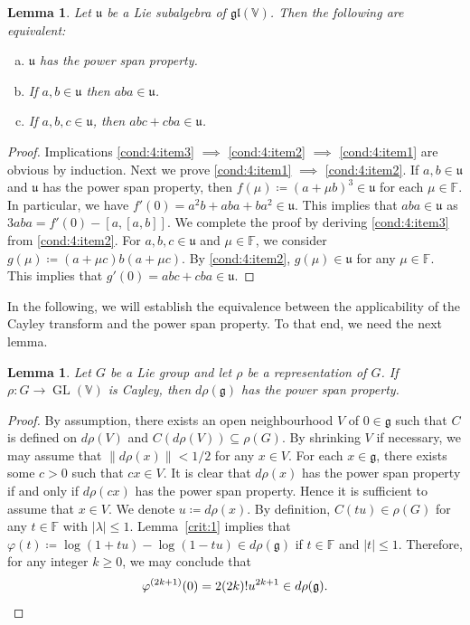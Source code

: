 \documentclass[11pt,reqno]{amsart}
\DeclareMathOperator{\GL}{GL}
\newtheorem{lemma}[theorem]{Lemma}
\begin{document}
\begin{lemma}\label{cond:4}
Let $\mathfrak{u}$ be a Lie subalgebra of $\mathfrak{gl}(\mathbb{V})$.  Then the following are equivalent:
\begin{enumerate}[(a)]
\item $\mathfrak{u}$ has the power span property. \label{cond:4:item1}
\item If $a, b \in \mathfrak{u}$ then $aba\in \mathfrak{u}$.  \label{cond:4:item2}
\item If $a, b, c \in \mathfrak{u}$,  then $abc + cba\in \mathfrak{u}$.  \label{cond:4:item3}
\end{enumerate}
\end{lemma}
\begin{proof}
Implications \eqref{cond:4:item3} $\implies$ \eqref{cond:4:item2} $\implies$ \eqref{cond:4:item1} are obvious by induction.  Next we prove \eqref{cond:4:item1} $\implies$ \eqref{cond:4:item2}.  If $a,b \in \mathfrak{u}$ and $\mathfrak{u}$ has the power span property,  then $f(\mu) \coloneqq (a+\mu b)^3 \in \mathfrak{u}$ for each $\mu \in \mathbb{F}$.  In particular,  we have $f'(0) = a^2b +aba +ba^2 \in \mathfrak{u}$.  This implies that $aba \in \mathfrak{u}$ as $3aba = f'(0) - [a,[a,b]]$.  We complete the proof by deriving \eqref{cond:4:item3} from \eqref{cond:4:item2}.  For $a,b,c\in \mathfrak{u}$ and $\mu \in \mathbb{F}$,  we consider $g(\mu) \coloneqq (a+\mu c)b(a+\mu c)$.  By \eqref{cond:4:item2},  $g(\mu) \in \mathfrak{u}$ for any $\mu \in \mathbb{F}$.  This implies that $g'(0) = abc + cba \in \mathfrak{u}$. 
\end{proof}

In the following,  we will establish the equivalence between the applicability of the Cayley transform and the power span property.  To that end,  we need the next lemma.
\begin{lemma}\label{lem:Cpsp}
Let $G$ be a Lie group and let $\rho$ be a representation of $G$.  If $\rho: G \to \GL(\mathbb{V})$ is Cayley,  then $d\rho (\mathfrak{g})$ has the power span property.
\end{lemma}
\begin{proof}
By assumption,  there exists an open neighbourhood $V$ of $0\in \mathfrak{g}$ such that $C$ is defined on $d\rho (V)$ and $C(d\rho(V)) \subseteq \rho(G)$.  By shrinking $V$ if necessary,  we may assume that $\lVert d\rho (x) \rVert < 1/2$ for any $x \in V$.  For each $x\in \mathfrak{g}$,  there exists some $c > 0$ such that $c x \in V$.  It is clear that $d\rho (x)$ has the power span property if and only if $d\rho ( cx)$ has the power span property.  Hence it is sufficient to assume that $x \in V$.  We denote $u \coloneqq d\rho (x)$.  By definition,  $C(t u) \in \rho(G)$ for any $t \in \mathbb{F}$ with $\lvert \lambda \rvert \le 1$.  Lemma~\ref{crit:1} implies that $\varphi(t) \coloneqq \log(1+t u)-\log(1- t u) \in  d\rho(\mathfrak{g})$ if $t\in \mathbb{F}$ and $\lvert t \rvert \le 1$.  Therefore,  for any integer $k \ge 0$,  we may conclude that
\[
\varphi^{(2k+1)}(0) = 2 (2k)! u^{2k+1} \in d\rho(\mathfrak{g}).  \qedhere
\]
\end{proof}
\end{document}
